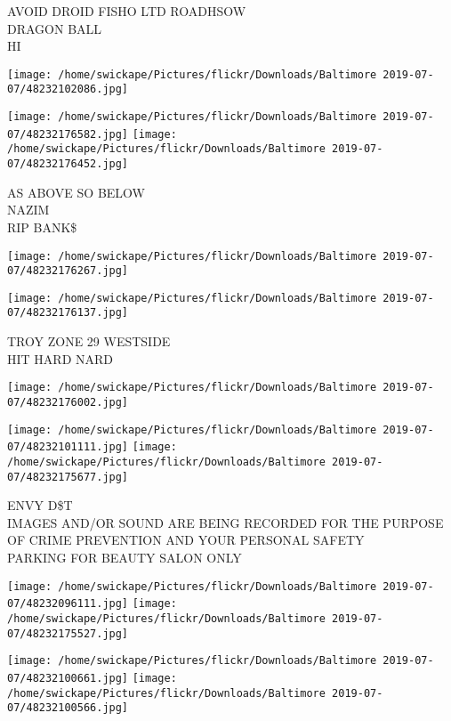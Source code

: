 \documentclass[10pt,letterpaper]{article}
\begin{document}
AVOID DROID FISHO LTD ROADHSOW\\
DRAGON BALL\\
HI
\pagebreak

\texttt{[image: /home/swickape/Pictures/flickr/Downloads/Baltimore 2019-07-07/48232102086.jpg]}

\vspace{0.25in}
\texttt{[image: /home/swickape/Pictures/flickr/Downloads/Baltimore 2019-07-07/48232176582.jpg]}
\texttt{[image: /home/swickape/Pictures/flickr/Downloads/Baltimore 2019-07-07/48232176452.jpg]}

AS ABOVE SO BELOW\\
NAZIM\\
RIP BANK\$
\pagebreak

\texttt{[image: /home/swickape/Pictures/flickr/Downloads/Baltimore 2019-07-07/48232176267.jpg]}

\vspace{0.25in}
\texttt{[image: /home/swickape/Pictures/flickr/Downloads/Baltimore 2019-07-07/48232176137.jpg]}

TROY ZONE 29 WESTSIDE\\
HIT HARD NARD
\pagebreak

\texttt{[image: /home/swickape/Pictures/flickr/Downloads/Baltimore 2019-07-07/48232176002.jpg]}

\vspace{0.25in}
\texttt{[image: /home/swickape/Pictures/flickr/Downloads/Baltimore 2019-07-07/48232101111.jpg]}
\texttt{[image: /home/swickape/Pictures/flickr/Downloads/Baltimore 2019-07-07/48232175677.jpg]}

ENVY D\$T\\
IMAGES AND/OR SOUND ARE BEING RECORDED FOR THE PURPOSE OF CRIME PREVENTION AND YOUR PERSONAL SAFETY\\
PARKING FOR BEAUTY SALON ONLY
\pagebreak

\texttt{[image: /home/swickape/Pictures/flickr/Downloads/Baltimore 2019-07-07/48232096111.jpg]}
\texttt{[image: /home/swickape/Pictures/flickr/Downloads/Baltimore 2019-07-07/48232175527.jpg]}

\texttt{[image: /home/swickape/Pictures/flickr/Downloads/Baltimore 2019-07-07/48232100661.jpg]}
\texttt{[image: /home/swickape/Pictures/flickr/Downloads/Baltimore 2019-07-07/48232100566.jpg]}
\end{document}
